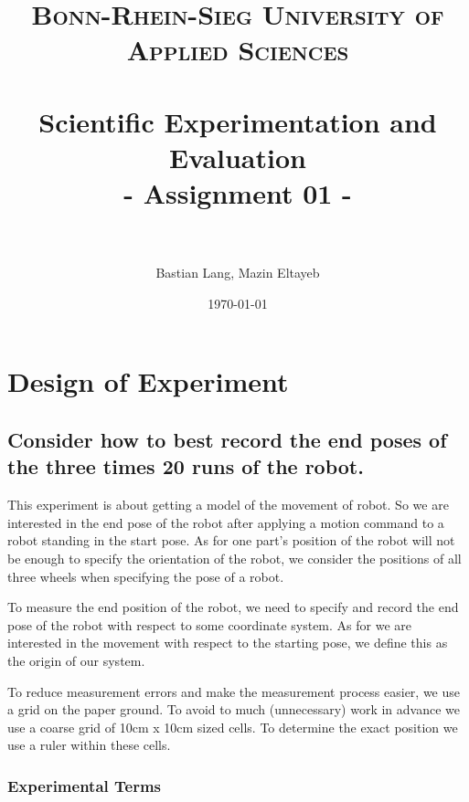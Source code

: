 \documentclass[paper=a4, fontsize=11pt]{scrartcl} %
\title{	
\normalfont \normalsize 
\textsc{Bonn-Rhein-Sieg University of Applied Sciences} \\ [25pt] %
\horrule{0.5pt} \\[0.4cm] %
\huge Scientific Experimentation and Evaluation\\
- Assignment 01 - \\ %
\horrule{2pt} \\[0.5cm] %
}
\author{Bastian Lang, Mazin Eltayeb} %
\date{\normalsize\today} %
\numberwithin{equation}{section} %
\numberwithin{figure}{section} %
\numberwithin{table}{section} %
\begin{document}
\maketitle %

\tableofcontents
\newpage

\section{Design of Experiment}
\subsection{Consider how to best record the end poses of the three times 20 runs of the robot.}
This experiment is about getting a model of the movement of robot. 
So we are interested in the end pose of the robot after applying a motion command to a robot standing in the start pose. 
As for one part's position of the robot will not be enough to specify the orientation of the robot, we consider the positions of all three wheels when specifying the pose of a robot.

To measure the end position of the robot, we need to specify and record the end pose of the robot with respect to some coordinate system. 
As for we are interested in the movement with respect to the starting pose, we define this as the origin of our system.

To reduce measurement errors and make the measurement process easier, we use a grid on the paper ground. 
To avoid to much (unnecessary) work in advance we use a coarse grid of 10cm x 10cm sized cells. 
To determine the exact position we use a ruler within these cells.

\subsubsection{Experimental Terms}
\end{document}

